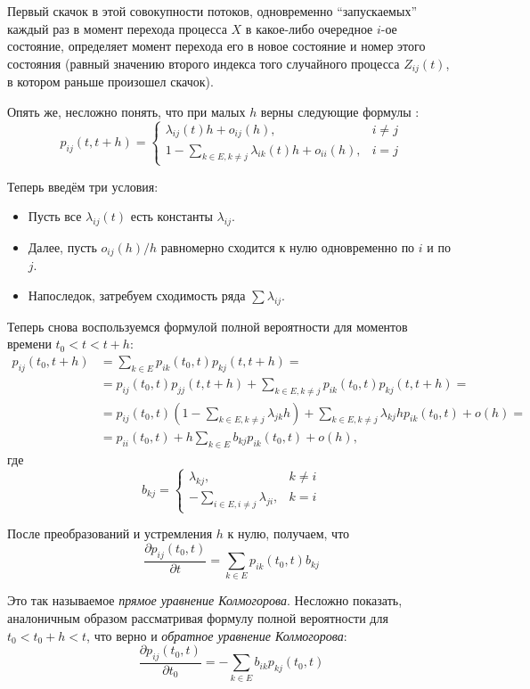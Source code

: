 Первый скачок в этой совокупности потоков, одновременно ``запускаемых'' каждый 
раз в момент перехода процесса \(X\) в какое-либо очередное \(i\)-ое состояние, 
определяет момент перехода его в новое состояние и номер этого состояния 
(равный значению второго индекса того случайного процесса \(Z_{ij}(t)\), в 
котором раньше произошел скачок). 

Опять же, несложно понять, что при малых \(h\) верны следующие формулы :
\[
	p_{ij}(t, t + h) = 
	\begin{cases}
	\lambda_{ij}(t)h + o_{ij}(h), & i \neq j \\
	1 - \sum_{k \in E, k \neq j}\lambda_{ik}(t)h + o_{ii}(h), & i = j
	\end{cases}
\]

Теперь введём три условия:
\begin{itemize}
	\item Пусть все \(\lambda_{ij}(t)\) есть константы \(\lambda_{ij}\).
	\item Далее, пусть \(o_{ij}(h)/h\) равномерно сходится к нулю одновременно 
	по \(i\) и по \(j\).
	\item Напоследок, затребуем сходимость ряда \(\sum \lambda_{ij}\).
\end{itemize}

Теперь снова воспользуемся формулой полной вероятности для моментов времени 
\(t_{0} < t < t + h\):
\begin{align*}
	p_{ij}(t_{0}, t + h) &= \sum_{k \in E} p_{ik}(t_{0}, t)p_{kj}(t, t + h) = \\
	&= p_{ij}(t_{0}, t)p_{jj}(t, t + h) + \sum_{k \in E, k \neq j} 
	p_{ik}(t_{0}, t)p_{kj}(t, t + h) = \\
	&= p_{ij}(t_{0}, t)\left(1 - \sum_{k \in E, k \neq j}\lambda_{jk}h\right) + 
	\sum_{k \in E, k \neq j}\lambda_{kj}hp_{ik}(t_{0}, t) + o(h) = \\
	&= p_{ii}(t_{0}, t) + h\sum_{k \in E} b_{kj}p_{ik}(t_{0}, t) + o(h),
\end{align*}
где
\[
	b_{kj} = \begin{cases}
	\lambda_{kj}, & k \neq i \\
	-\sum_{i \in E, i \neq j} \lambda_{ji}, & k = i
	\end{cases}
\]

После преобразований и устремления \(h\) к нулю, получаем, что
\[
	\frac{\partial p_{ij}(t_{0}, t)}{\partial t} = \sum_{k \in E} 
	p_{ik}(t_{0}, t)b_{kj}
\]

Это так называемое \emph{прямое уравнение Колмогорова}. Несложно показать, 
аналоничным образом рассматривая формулу полной вероятности для \(t_{0} < t_{0} 
+ h < t\), что верно и \emph{обратное уравнение Колмогорова}:
\[
	\frac{\partial p_{ij}(t_{0}, t)}{\partial t_{0}} = -\sum_{k \in E} b_{ik} 
	p_{kj}(t_{0}, t)
\]


